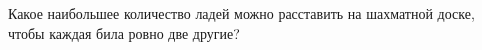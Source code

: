 Какое наибольшее количество ладей можно расставить на шахматной доске, чтобы каждая била ровно две другие?